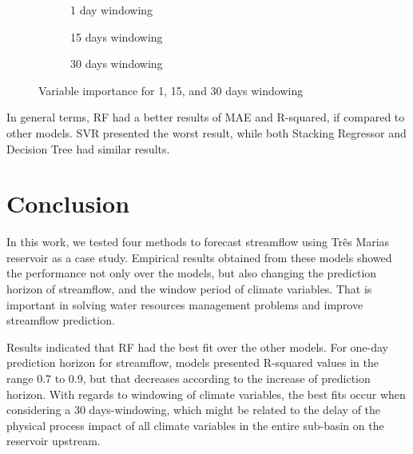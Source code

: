 \documentclass[12pt]{article}
\begin{document}
\begin{figure}[htbp]
    \centering
    \begin{subfigure}[b]{.49\textwidth}
        \centering
        
        \caption{1 day windowing}
        \label{fig:CategorizedImportance01}
    \end{subfigure}
    \begin{subfigure}[b]{.49\textwidth}
        \centering
        
        \caption{15 days windowing}
        \label{fig:CategorizedImportance02}
    \end{subfigure}
    \begin{subfigure}[b]{\textwidth}
        \centering
        
        \captionsetup{justification=justified,singlelinecheck=false}
        \caption{30 days windowing}
        \label{fig:CategorizedImportance03}
    \end{subfigure}
    \caption{Variable importance for  1,  15, and  30 days windowing}
    \label{fig:CategorizedImportance}
\end{figure}

In general terms, RF had a better results of MAE and R-squared, if compared to other models. SVR presented the worst result, while both Stacking Regressor and Decision Tree had similar results.

\section{Conclusion}
\label{sec:Conclusion}

In this work, we tested four methods to forecast streamflow using Três Marias reservoir as a case study. Empirical results obtained from these models showed the performance not only over the models, but also changing the prediction horizon of streamflow, and the window period of climate variables. That is important in solving water resources management problems and improve streamflow prediction.

Results indicated that RF had the best fit over the other models. For one-day prediction horizon for streamflow, models presented R-squared values in the range 0.7 to 0.9, but that decreases according to the increase of  prediction horizon. With regards to windowing of climate variables, the best fits occur when considering a 30 days-windowing, which might be related to the delay of the physical process impact of all climate variables in the entire sub-basin on the reservoir upstream.
\end{document}
